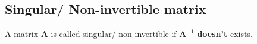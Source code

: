 \subsection{Singular/ Non-invertible matrix}

A matrix $\bm{A}$ is called singular/ non-invertible if $\bm{A}^{-1}$ \textbf{doesn't} exists.
\hfill \cite{mfml/book/mml/Deisenroth-Faisal-Ong}




